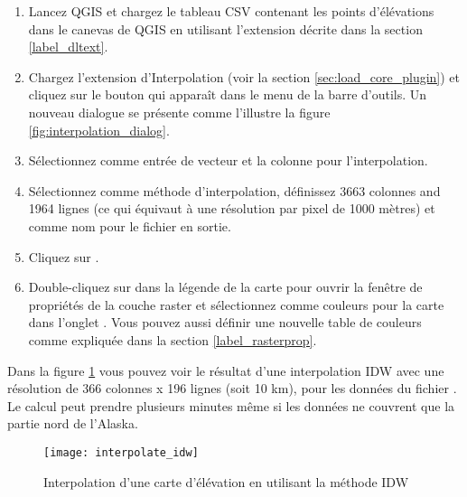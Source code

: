 \begin{enumerate}
  \item Lancez QGIS et chargez le tableau CSV  contenant les points d'\'el\'evations dans le canevas de QGIS en utilisant l'extension d\'ecrite dans la section \ref{label_dltext}. 
  \item Chargez l'extension d'Interpolation (voir la section \ref{sec:load_core_plugin}) et cliquez sur le bouton  qui appara\^it dans le menu de la barre d'outils. Un nouveau dialogue se pr\'esente comme l'illustre la figure \ref{fig:interpolation_dialog}.
  \item S\'electionnez  comme entr\'ee de vecteur et la colonne pour l'interpolation.
  \item S\'electionnez  comme m\'ethode d'interpolation, d\'efinissez 3663 colonnes and 1964 lignes (ce qui \'equivaut \`a une r\'esolution par pixel de 1000 m\`etres) et  comme nom pour le fichier en sortie.
  \item Cliquez sur .
  \item Double-cliquez sur  dans la l\'egende de la carte pour ouvrir la fen\^etre de propri\'et\'es de la couche raster et s\'electionnez  comme couleurs pour la carte dans l'onglet . Vous pouvez aussi d\'efinir une nouvelle table de couleurs comme expliqu\'ee dans la section \ref{label_rasterprop}.
\end{enumerate}

%
%

Dans la figure \ref{fig:interpolation_idw} vous pouvez voir le r\'esultat d'une interpolation IDW avec une r\'esolution de 366 colonnes x 196 lignes (soit 10 km), pour les donn\'ees du fichier . Le calcul peut prendre plusieurs minutes m\^eme si les donn\'ees ne couvrent que la partie nord de l'Alaska.

\begin{figure}[ht]
   \begin{center}
   \caption{Interpolation d'une carte d'\'el\'evation en utilisant la m\'ethode IDW \nixcaption}\label{fig:interpolation_idw}\smallskip
   \texttt{[image: interpolate\_idw]}
\end{center}  
\end{figure}

\newpage